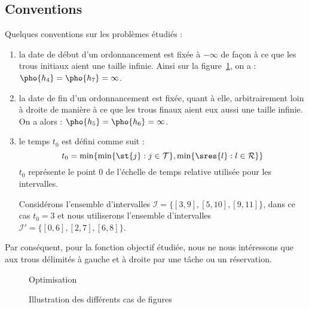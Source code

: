\documentclass[a4paper,9pt]{book}
\begin{document}
\subsection{Conventions}
    Quelques conventions sur les problèmes étudiés : \begin{enumerate}
        \item la date de début d'un ordonnancement est fixée à $- \infty$ de façon à
            ce que les trous initiaux aient une taille infinie. Ainsi sur la figure~\ref{prescas},
            on a : $\pho{h_4} = \pho{h_7} = \infty$.
        \item la date de fin d'un ordonnancement est fixée, quant à elle, arbitrairement loin à
            droite de manière à ce que les trous finaux aient eux aussi une taille infinie. On a
            alors : $\pho{h_5} = \pho{h_6} = \infty$.
        \item le temps $t_0$ est défini comme suit : \[
                t_0 = \min\{\min\{\st{j} : j \in \mathcal{T}\}, \min\{\sres{l} : l \in \mathcal{R}\}\}
            \]
            $t_0$ représente le point $0$ de l'échelle de temps relative utilisée pour les
            intervalles.

            Considérons l'ensemble d'intervalles $\mathcal{I} = \{[3,9], [5,10], [9,11]\}$, dans ce
            cas $t_0 = 3$ et nous utiliserons l'ensemble d'intervalles $\mathcal{I}' = \{[0,6],
            [2,7], [6,8]\}$.
    \end{enumerate}

    Par conséquent, pour la fonction objectif étudiée, nous ne
    nous intéressons que aux trous délimités à gauche et à droite par une tâche ou un réservation.

\begin{figure}
    \begin{center}
        \begin{ordo}[10]{3}{1}{9}
            Optimisation




        \end{ordo}
    \end{center}
    \caption{Illustration des différents cas de figures}
    \label{prescas}
\end{figure}
\end{document}
